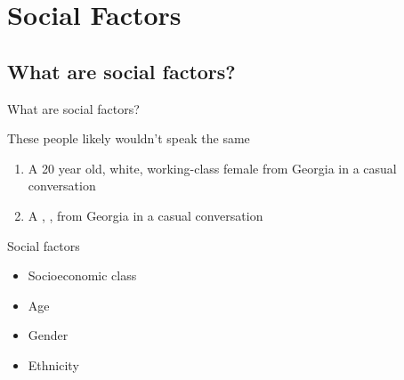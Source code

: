 \documentclass{beamer}
\subtitle[Social Factors]{Social Factors in Language Variation}
\newcommand{\suboneone}{What are social factors?}
\begin{document}
  

  \section{Social Factors}
    \subsection{\suboneone}
      \begin{frame}{\suboneone}
        \begin{block}{These people likely wouldn't speak the same}
          \begin{enumerate}
            \item A \alert<2>{20 year old}, \alert<4>{white}, \alert<1>{working-class} \alert<3>{female} from Georgia in a casual conversation
            \item A , ,   from Georgia in a casual conversation
          \end{enumerate}
        \end{block}
        \begin{block}{Social factors}
          \begin{itemize}
            \item Socioeconomic class
            \item<2-> Age
            \item<3-> Gender
            \item<4-> Ethnicity
          \end{itemize}
        \end{block}
      \end{frame}
\end{document}

